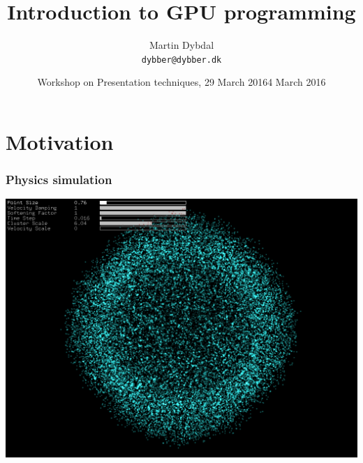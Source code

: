 \documentclass{beamer}
\title[FCL] %
  {Introduction to GPU programming} %
\author{\footnotesize{Martin Dybdal} \\ \footnotesize{\texttt{dybber@dybber.dk}}}
\institute {
HIPERFIT research center \\
DIKU \\
University of Copenhagen
}
\date{\footnotesize{Workshop on Presentation techniques, 29 March 2016}}
\date[4 March 2016]{4 March 2016}
\begin{document}
{
\begin{frame}
  \titlepage
\end{frame}
}




\section{Motivation}

\begin{frame}
\frametitle{Physics simulation}
\includegraphics[width=\textwidth]{graphics/opencl_nbody}
\end{frame}
\end{document}
